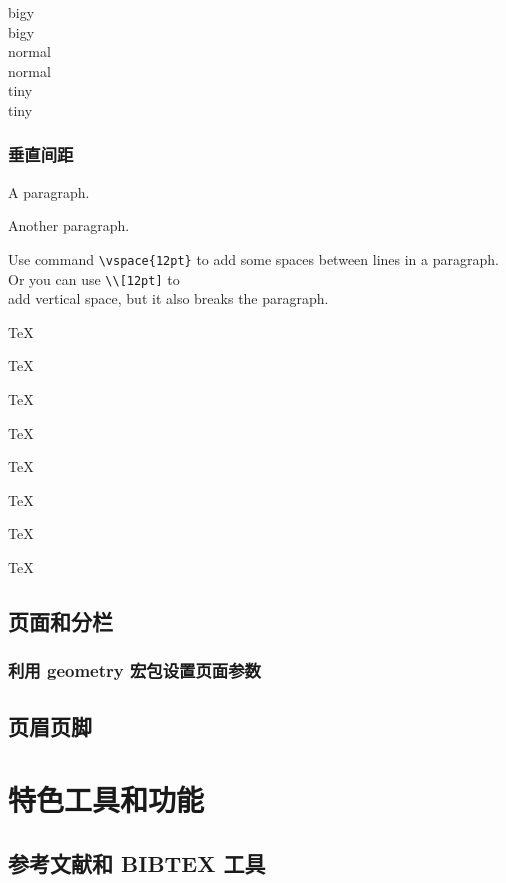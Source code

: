\documentclass[12pt,UTF8]{ctexart}%
\begin{document}
{\Large big\hspace{1em}y}\\
{\Large big\quad y}\\
nor\hspace{2em}mal\\
nor\qquad mal\\
{\tiny tin\hspace{1em}y}\\
{\tiny tin\quad y}


\subsubsection{垂直间距}

A paragraph.\par
\vspace{2ex}
Another paragraph.

Use command \verb|\vspace{12pt}|
to add \vspace{12pt} some spaces
between lines in a paragraph.
Or you can use \verb|\\[12pt]|
to \\[12pt] add vertical space,
but it also breaks the paragraph.

\parbox[t]{3em}{TeX\par TeX}
\parbox[t]{3em}{TeX\par\smallskip TeX}
\parbox[t]{3em}{TeX\par\medskip TeX}
\parbox[t]{3em}{TeX\par\bigskip TeX}

\subsection{页面和分栏}

\subsubsection{利用 geometry 宏包设置页面参数}

\subsection{页眉页脚}


\section{特色工具和功能}

\subsection{参考文献和 BIBTEX 工具}
\end{document}

